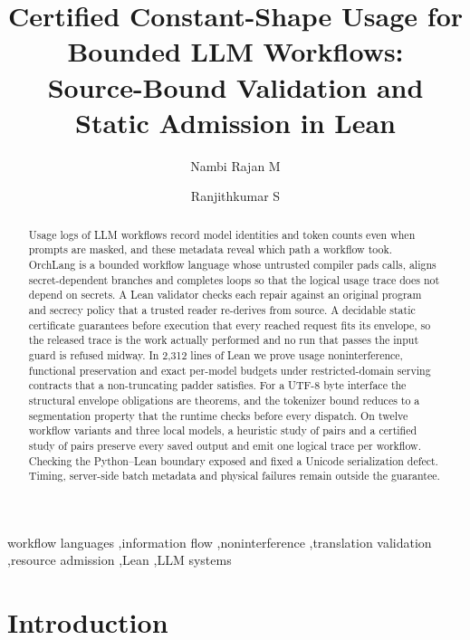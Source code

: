 \documentclass[preprint,12pt]{elsarticle}
\theoremstyle{definition}
\begin{document}
\begin{frontmatter}
\title{Certified Constant-Shape Usage for Bounded LLM Workflows:\\
Source-Bound Validation and Static Admission in Lean}
\author[vit]{Nambi Rajan M}
\author[vit]{Ranjithkumar S}
\begin{abstract}
Usage logs of LLM workflows record model identities and token counts even when
prompts are masked, and these metadata reveal which path a workflow took.
OrchLang is a bounded workflow language whose untrusted compiler pads calls,
aligns secret-dependent branches and completes loops so that the logical usage
trace does not depend on secrets. A Lean validator checks each repair against an
original program and secrecy policy that a trusted reader re-derives from source.
A decidable static certificate guarantees before execution that every reached
request fits its envelope, so the released trace is the work actually performed
and no run that passes the input guard is refused midway. In 2,312 lines of Lean we prove usage
noninterference, functional preservation and exact per-model budgets under
restricted-domain serving contracts that a non-truncating padder satisfies.
For a UTF-8 byte interface the structural envelope obligations are theorems, and
the tokenizer bound reduces to a segmentation property that the runtime checks
before every dispatch. On twelve workflow variants and three local models, a
heuristic study of \roundTwoPairs{} pairs and a certified study of
\rThreeCertPairs{} pairs preserve every saved output and emit one logical trace
per workflow. Checking the Python--Lean boundary exposed and fixed a Unicode
serialization defect. Timing, server-side batch metadata and physical failures
remain outside the guarantee.
\end{abstract}
\begin{keyword}
workflow languages \sep information flow \sep noninterference \sep translation validation \sep resource admission \sep Lean \sep LLM systems
\end{keyword}
\end{frontmatter}

\section{Introduction}\label{sec:intro}
\end{document}
